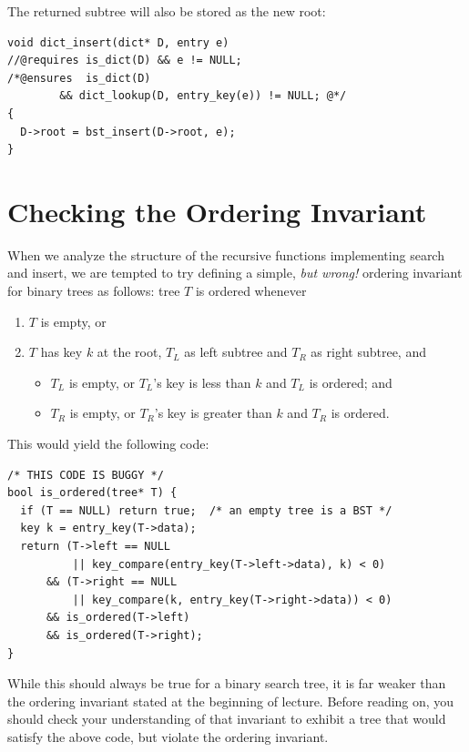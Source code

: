 The returned subtree will
also be stored as the new root:

\begin{lstlisting}[language={[C0]C}]
void dict_insert(dict* D, entry e)
//@requires is_dict(D) && e != NULL;
/*@ensures  is_dict(D)
        && dict_lookup(D, entry_key(e)) != NULL; @*/
{
  D->root = bst_insert(D->root, e);
}
\end{lstlisting}

\section{Checking the Ordering Invariant}
\label{sec:bst:bst_invariant}

When we analyze the structure of the recursive functions implementing
search and insert, we are tempted to try defining a simple,
\emph{but wrong!} ordering invariant for binary trees as follows:
tree $T$ is ordered whenever
\begin{enumerate}
\item $T$ is empty, or
\item $T$ has key $k$ at the root, $T_L$ as left subtree and $T_R$ as
  right subtree, and
  \begin{itemize}
  \item $T_L$ is empty, or $T_L$'s key is less than $k$ and $T_L$ is
    ordered; and
  \item $T_R$ is empty, or $T_R$'s key is greater than $k$ and $T_R$
    is ordered.
  \end{itemize}
\end{enumerate}
This would yield the following code:
\begin{lstlisting}[language={[C0]C}]
/* THIS CODE IS BUGGY */
bool is_ordered(tree* T) {
  if (T == NULL) return true;  /* an empty tree is a BST */
  key k = entry_key(T->data);
  return (T->left == NULL
          || key_compare(entry_key(T->left->data), k) < 0)
      && (T->right == NULL
          || key_compare(k, entry_key(T->right->data)) < 0)
      && is_ordered(T->left)
      && is_ordered(T->right);
}
\end{lstlisting}
While this should always be true for a binary search tree, it is far
weaker than the ordering invariant stated at the beginning of lecture.
Before reading on, you should check your understanding of that
invariant to exhibit a tree that would satisfy the above code, but
violate the ordering invariant.

